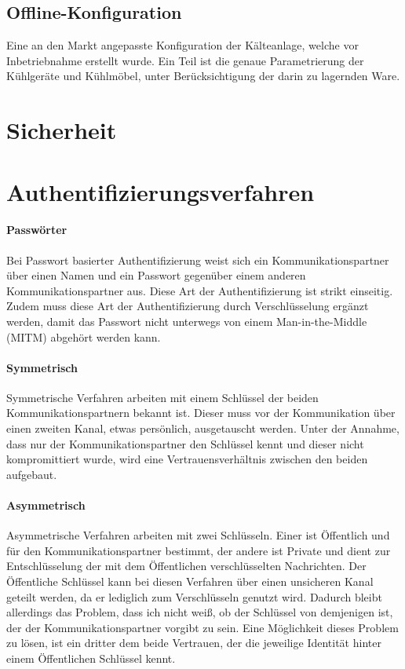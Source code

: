 \documentclass[11pt,a4paper]{report}
\begin{document}
\subsection{Offline-Konfiguration} Eine an den Markt angepasste Konfiguration der Kälteanlage, welche vor Inbetriebnahme erstellt wurde. Ein Teil ist die genaue Parametrierung der Kühlgeräte und Kühlmöbel, unter Berücksichtigung der darin zu lagernden Ware.

\section{Sicherheit}

\section{Authentifizierungsverfahren}

\paragraph{Passwörter}

Bei Passwort basierter Authentifizierung weist sich ein Kommunikationspartner über einen Namen und ein Passwort gegenüber einem anderen Kommunikationspartner aus. Diese Art der Authentifizierung ist strikt einseitig. Zudem muss diese Art der Authentifizierung durch Verschlüsselung ergänzt werden, damit das Passwort nicht unterwegs von einem Man-in-the-Middle (MITM) abgehört werden kann.

\paragraph{Symmetrisch}

Symmetrische Verfahren arbeiten mit einem Schlüssel der beiden Kommunikationspartnern bekannt ist. Dieser muss vor der Kommunikation über einen zweiten Kanal, etwas persönlich, ausgetauscht werden. Unter der Annahme, dass nur der Kommunikationspartner den Schlüssel kennt und dieser nicht kompromittiert wurde, wird eine Vertrauensverhältnis zwischen den beiden aufgebaut.

\paragraph{Asymmetrisch}

Asymmetrische Verfahren arbeiten mit zwei Schlüsseln. Einer ist Öffentlich und für den Kommunikationspartner bestimmt, der andere ist Private und dient zur Entschlüsselung der mit dem Öffentlichen verschlüsselten Nachrichten. Der Öffentliche Schlüssel kann bei diesen Verfahren über einen unsicheren Kanal geteilt werden, da er lediglich zum Verschlüsseln genutzt wird. Dadurch bleibt allerdings das Problem, dass ich nicht weiß, ob der Schlüssel von demjenigen ist, der der Kommunikationspartner vorgibt zu sein. Eine Möglichkeit dieses Problem zu lösen, ist ein dritter dem beide Vertrauen, der die jeweilige Identität hinter einem Öffentlichen Schlüssel kennt.
\end{document}
